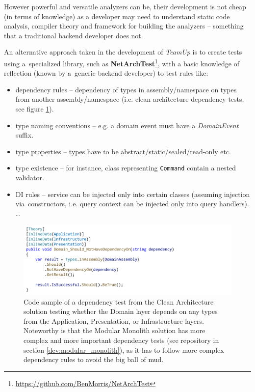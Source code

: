 However powerful and versatile analyzers can be, their development is not cheap (in terms of knowledge) as a developer may need to understand static code analysis, compiler theory and framework for building the analyzers -- something that a traditional backend developer does not.

An alternative approach taken in the development of \textit{TeamUp} is to create tests using a~specialized library, such as \textbf{NetArchTest}\footnote{\url{https://github.com/BenMorris/NetArchTest}}, with a basic knowledge of reflection (known by a~generic backend developer) to test rules like:

\begin{itemize}
    \item dependency rules -- dependency of types in assembly/namespace on types from another assembly/namespace (i.e. clean architecture dependency tests, see figure \ref{fig:dependency_test}).
    
    \item type naming conventions -- e.g. a domain event must have a \textit{DomainEvent} suffix.
    
    \item type properties -- types have to be abstract/static/sealed/read-only etc.
    
    \item type existence -- for instance, class representing \texttt{Command} contain a nested validator.
    
    \item DI rules -- service can be injected only into certain classes (assuming injection via~constructors, i.e. query context can be injected only into query handlers).
    \\\dots
\end{itemize}

\begin{figure} [H]
    \centering
    \includegraphics[width=\textwidth]{figures/dependency-test.pdf}
    \caption{Code sample of a dependency test from the Clean Architecture solution testing whether  the Domain layer depends on any types from the Application, Presentation, or Infrastructure layers. Noteworthy is that the Modular Monolith solution has more complex and more important dependency tests (see repository in section \ref{dev:modular_monolith}), as it has to follow more complex dependency rules to avoid the big ball of mud.}
    \label{fig:dependency_test}
\end{figure}

